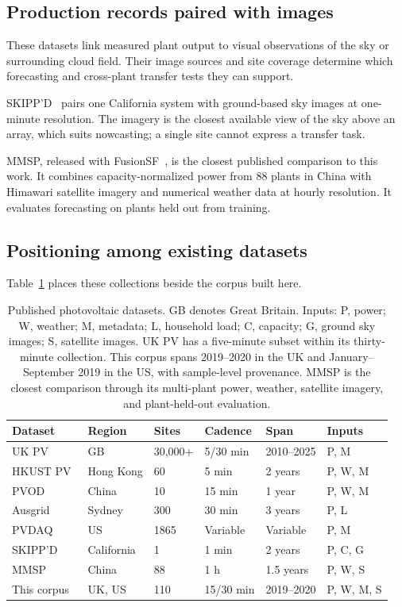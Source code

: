 \subsection{Production records paired with images}

These datasets link measured plant output to visual observations of the sky or surrounding cloud field. Their image sources and site coverage determine which forecasting and cross-plant transfer tests they can support.

SKIPP'D~\cite{skippd} pairs one California system with ground-based sky images at one-minute resolution. The imagery is the closest available view of the sky above an array, which suits nowcasting; a single site cannot express a transfer task.

MMSP, released with FusionSF~\cite{fusionsf}, is the closest published comparison to this work. It combines capacity-normalized power from 88 plants in China with Himawari satellite imagery and numerical weather data at hourly resolution. It evaluates forecasting on plants held out from training.

\subsection{Positioning among existing datasets}
\label{sec:dataset-positioning}

Table~\ref{tab:dataset-comparison} places these collections beside the corpus built here.

\begin{table}[htbp]
\centering
\begin{tabular}{@{}llllll@{}}
\hline
Dataset & Region & Sites & Cadence & Span & Inputs \\
\hline
UK PV~\cite{ukpv} & GB & 30,000+ & 5/30 min & 2010--2025 & P, M \\
HKUST PV~\cite{hkpvdata} & Hong Kong & 60 & 5 min & 2 years & P, W, M \\
PVOD~\cite{pvod} & China & 10 & 15 min & 1 year & P, W, M \\
Ausgrid~\cite{ausgrid} & Sydney & 300 & 30 min & 3 years & P, L \\
PVDAQ~\cite{pvdaq} & US & 1865 & Variable & Variable & P, M \\
SKIPP'D~\cite{skippd} & California & 1 & 1 min & 2 years & P, C, G \\
MMSP~\cite{fusionsf} & China & 88 & 1 h & 1.5 years & P, W, S \\
This corpus & UK, US & 110 & 15/30 min & 2019--2020 & P, W, M, S \\
\hline
\end{tabular}
\caption{Published photovoltaic datasets. GB denotes Great Britain. Inputs: P, power; W, weather; M, metadata; L, household load; C, capacity; G, ground sky images; S, satellite images. UK PV has a five-minute subset within its thirty-minute collection. This corpus spans 2019--2020 in the UK and January--September 2019 in the US, with sample-level provenance. MMSP is the closest comparison through its multi-plant power, weather, satellite imagery, and plant-held-out evaluation.}
\label{tab:dataset-comparison}
\end{table}

